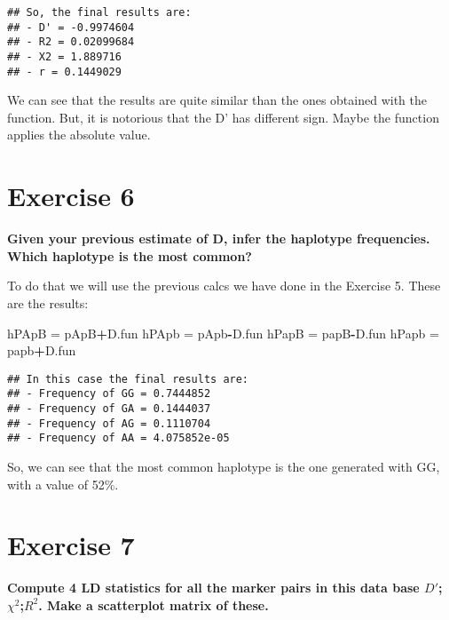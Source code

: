 \documentclass[]{article}
\newenvironment{Shaded}{\begin{snugshade}}{\end{snugshade}}
\newcommand{\StringTok}[1]{\textcolor[rgb]{0.31,0.60,0.02}{#1}}
\newcommand{\OperatorTok}[1]{\textcolor[rgb]{0.81,0.36,0.00}{\textbf{#1}}}
\newcommand{\NormalTok}[1]{#1}
\begin{document}
\begin{verbatim}
## So, the final results are:
## - D' = -0.9974604 
## - R2 = 0.02099684 
## - X2 = 1.889716 
## - r = 0.1449029
\end{verbatim}

We can see that the results are quite similar than the ones obtained
with the function. But, it is notorious that the D' has different sign.
Maybe the function applies the absolute value.

\section{Exercise 6}\label{exercise-6}

\textbf{Given your previous estimate of D, infer the haplotype
frequencies. Which haplotype is the most common?}

To do that we will use the previous calcs we have done in the Exercise
5. These are the results:

\begin{Shaded}
\begin{Highlighting}[]
\NormalTok{hPApB =}\StringTok{ }\NormalTok{pApB}\OperatorTok{+}\NormalTok{D.fun}
\NormalTok{hPApb =}\StringTok{ }\NormalTok{pApb}\OperatorTok{-}\NormalTok{D.fun}
\NormalTok{hPapB =}\StringTok{ }\NormalTok{papB}\OperatorTok{-}\NormalTok{D.fun}
\NormalTok{hPapb =}\StringTok{ }\NormalTok{papb}\OperatorTok{+}\NormalTok{D.fun}
\end{Highlighting}
\end{Shaded}

\begin{verbatim}
## In this case the final results are:
## - Frequency of GG = 0.7444852 
## - Frequency of GA = 0.1444037 
## - Frequency of AG = 0.1110704 
## - Frequency of AA = 4.075852e-05
\end{verbatim}

So, we can see that the most common haplotype is the one generated with
GG, with a value of 52\%.

\section{Exercise 7}\label{exercise-7}

\textbf{Compute 4 LD statistics for all the marker pairs in this data
base \(D'\);\(\chi^2\);\(R^2\). Make a scatterplot matrix of these.}
\end{document}
